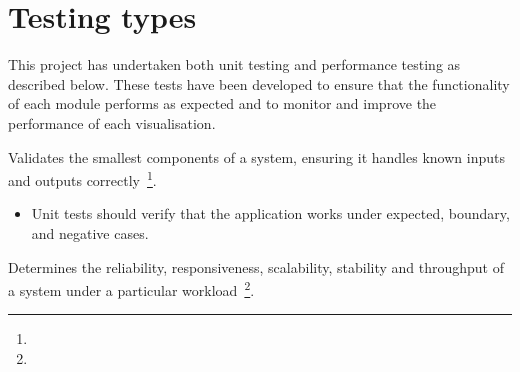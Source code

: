 \section{Testing types} {
\label{sec:testing_types}

	This project has undertaken both unit testing and performance testing as described below. These tests have been developed to ensure that the functionality of each module performs as expected and to monitor and improve the performance of each visualisation.

	\begin{description}[leftmargin=0pt]
		\item[Unit testing:] Validates the smallest components of a system, ensuring it handles known inputs and outputs correctly~\footnote{}.
			\begin{itemize}
				\item Unit tests should verify that the application works under expected, boundary, and negative cases.
			\end{itemize}
		\item[Performance testing:] Determines the reliability, responsiveness, scalability, stability and throughput of a system under a particular workload~\footnote{}.
	\end{description}

}






	

